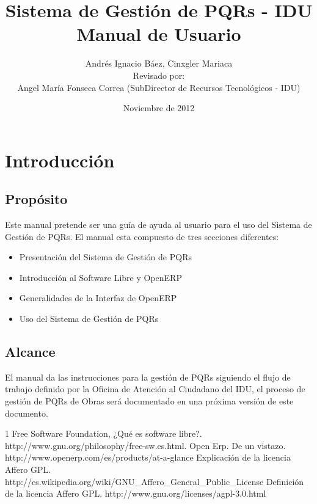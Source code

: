 \documentclass[letterpaper,12pt]{article}
\title{Sistema de Gestión de PQRs - IDU\\Manual de Usuario}
\author{Andrés Ignacio Báez, Cinxgler Mariaca\\Revisado por: \\
Angel María Fonseca Correa (SubDirector de Recursos Tecnológicos - IDU)}
\date{Noviembre de 2012}
\begin{document}
\maketitle
\section{Introducción}
\subsection{Propósito}
Este manual pretende ser una guía de ayuda al usuario para el uso del Sistema de Gestión de PQRs. El manual esta compuesto de tres secciones diferentes:
\begin{itemize}
 \item Presentación del Sistema de Gestión de PQRs
 \item Introducción al Software Libre y OpenERP
 \item Generalidades de la Interfaz de OpenERP
 \item Uso del Sistema de Gestión de PQRs
\end{itemize}

\subsection{Alcance}
El manual da las instrucciones para la gestión de PQRs siguiendo el flujo de trabajo definido por la Oficina de Atención al Ciudadano del IDU, el proceso de gestión de PQRs de Obras será documentado en una próxima versión de este documento. 







\begin {thebibliography}{1} 
 Free Software Foundation, ¿Qué es software libre?. http://www.gnu.org/philosophy/free-sw.es.html.
 Open Erp. De un vistazo. http://www.openerp.com/es/products/at-a-glance
 Explicación de la licencia Affero GPL. \\http://es.wikipedia.org/wiki/GNU\_Affero\_General\_Public\_License 
 Definición de la licencia Affero GPL. http://www.gnu.org/licenses/agpl-3.0.html
\end {thebibliography}
\end{document}
